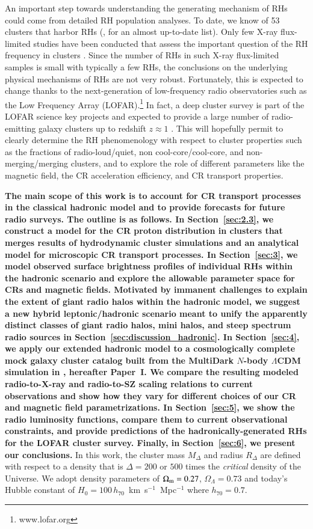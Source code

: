 \documentclass[useAMS,usenatbib]{mn2e}
\begin{document}
An important step towards understanding the generating mechanism of RHs could
come from detailed RH population analyses. To date, we know of 53 clusters that
harbor RHs (\citealp{2012A&ARv..20...54F}, for an almost up-to-date list). Only
few X-ray flux-limited studies have been conducted that assess the important
question of the RH frequency in clusters \citep{1999NewA....4..141G,
  VenturiGMRT_2,2013arXiv1306.3102K}. Since the number of RHs in such X-ray
flux-limited samples is small with typically a few RHs, the conclusions on the
underlying physical mechanisms of RHs are not very robust. Fortunately, this is
expected to change thanks to the next-generation of low-frequency radio
observatories such as the Low Frequency Array (LOFAR).\footnote{www.lofar.org}
In fact, a deep cluster survey is part of the LOFAR science key projects and
expected to provide a large number of radio-emitting galaxy clusters up to
redshift $z\approx1$ \citep{2012JApA..tmp...34R}. This will hopefully permit to
clearly determine the RH phenomenology with respect to cluster properties such
as the fractions of radio-loud/quiet, non cool-core/cool-core, and
non-merging/merging clusters, and to explore the role of different parameters
like the magnetic field, the CR acceleration efficiency, and CR transport
properties.

{\bf The main scope of this work is to account for CR transport processes in the
  classical hadronic model and to provide forecasts for future radio
  surveys. The outline is as follows. In Section~\ref{sec:2.3}, we construct a
  model for the CR proton distribution in clusters that merges results of
  hydrodynamic cluster simulations and an analytical model for microscopic CR
  transport processes. In Section~\ref{sec:3}, we model observed surface
  brightness profiles of individual RHs within the hadronic scenario and explore
  the allowable parameter space for CRs and magnetic fields. Motivated by
  immanent challenges to explain the extent of giant radio halos within the
  hadronic model, we suggest a new hybrid leptonic/hadronic scenario meant to
  unify the apparently distinct classes of giant radio halos, mini halos, and
  steep spectrum radio sources in Section~\ref{sec:discussion_hadronic}. In
  Section~\ref{sec:4}, we apply our extended hadronic model to a cosmologically
  complete mock galaxy cluster catalog built from the MultiDark $N$-body
  $\Lambda$CDM simulation in \cite{paper1}, hereafter Paper~I.  We compare the
  resulting modeled radio-to-X-ray and radio-to-SZ scaling relations to current
  observations and show how they vary for different choices of our CR and
  magnetic field parametrizations. In Section~\ref{sec:5}, we show the radio
  luminosity functions, compare them to current observational constraints, and
  provide predictions of the hadronically-generated RHs for the LOFAR cluster
  survey. Finally, in Section~\ref{sec:6}, we present our conclusions.} In this
work, the cluster mass $M_{\Delta}$ and radius $R_{\Delta}$ are defined with
respect to a density that is $\Delta=200$ or $500$ times the
\emph{critical} density of the Universe. We adopt density parameters of
$\Omega_{{\mathrm{m}}}=0.27$, $\Omega_{\Lambda}=0.73$ and today's Hubble constant of
$H_0 = 100 \, h_{70}$~km~s$^{-1}$~Mpc$^{-1}$ where $h_{70} = 0.7$.
\end{document}
